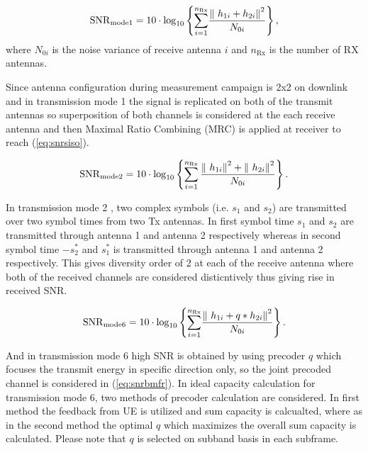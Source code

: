 \documentclass[a4paper,10pt]{article}
\begin{document}
\begin{equation} \label{eq:snrsiso}
\mathrm{SNR}_{\mathrm{mode1}} = 10\cdot{\mathrm{log}}_{10} \left\lbrace {\sum_{i=1}^{n_{\mathrm{Rx}}}} {\frac{{\| \ {h_{1i}} + {h_{2i}} \| \\}^2}{N_{0i}}}\right\rbrace,
\end{equation}
where $N_{0i}$ is the noise variance of receive antenna $i$ and $n_{\mathrm{Rx}}$ is the number of RX antennas.

Since antenna configuration during measurement campaign is 2x2 on downlink and in transmission mode 1 the signal is replicated on both of the transmit antennas so superposition of both channels is considered at the each receive antenna and then Maximal Ratio Combining (MRC) is applied at receiver to reach (\ref{eq:snrsiso}). 
 
\begin{equation} \label{eq:snralam}
\mathrm{SNR}_{\mathrm{mode2}} = 10\cdot{\mathrm{log}}_{10} \left\lbrace {\sum_{i=1}^{n_{\mathrm{Rx}}}} \, {\frac{ {\| \ {h_{1i}} \| \\}^2 +  {\| \ {h_{2i}} \| \\}^2 }{N_{0i}}}\right\rbrace. 
\end{equation}

In transmission mode 2 , two complex symbols (i.e. $s_1$ and $s_2$) are transmitted over two symbol times from two Tx antennas. In first symbol time $s_1$ and $s_2$ are transmitted through antenna 1 and antenna 2 respectively whereas in second symbol time $-{s_{2}^{*}}$ and ${s_{1}^{*}}$ is transmitted through antenna 1 and antenna 2 respectively. This gives diversity order of 2 at each of the receive antenna where both of the received channels are considered disticntively thus giving rise in received SNR. 

\begin{equation} \label{eq:snrbmfr}
\mathrm{SNR}_{\mathrm{mode6}} = 10\cdot{\mathrm{log}}_{10} \left\lbrace {\sum_{i=1}^{n_{\mathrm{Rx}}}} {\frac{{\| \ {h_{1i}} + q*{h_{2i}} \| \\}^2}{N_{0i}}}\right\rbrace. 
\end{equation}

And in transmission mode 6 high SNR is obtained by using precoder $q$ which focuses the transmit energy in specific direction only, so the joint precoded channel is considered in (\ref{eq:snrbmfr}). In ideal capacity calculation for transmission mode 6, two methods of precoder calculation are considered. In first method the feedback from UE is utilized and sum capacity is calcualted, where as in the second method the optimal $q$ which maximizes the overall sum capacity is calculated. Please note that $q$ is selected on subband basis in each subframe.
\end{document}
